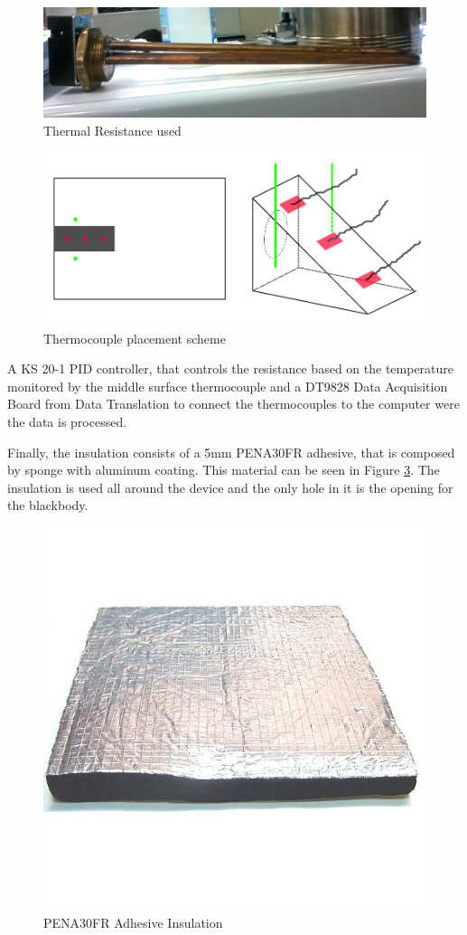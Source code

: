 \begin{figure}[h]
\centering
\includegraphics[width=0.9\linewidth]{Figures/4.Chapter/resistencia.png}
\caption{Thermal Resistance used}
\label{fig:res}
\end{figure}

\begin{figure}[h]
\centering
\includegraphics[width=0.9\linewidth]{Figures/4.Chapter/termopares.png}
\caption{Thermocouple placement scheme}
\label{fig:tpar}
\end{figure}

\par A KS 20-1 PID controller, that controls the resistance based on the temperature monitored by the middle surface thermocouple and a DT9828 Data Acquisition Board from Data Translation to connect the thermocouples to the computer were the data is processed.\\

\par Finally, the insulation consists of a 5mm PENA30FR adhesive, that is composed by sponge with aluminum coating. This material can be seen in Figure \ref{fig:isola}. The insulation is used all around the device and the only hole in it is the opening for the blackbody. \\

\begin{figure}[h]
\centering
\includegraphics[width=0.5\linewidth]{Figures/4.Chapter/insulation.jpg}
\caption{PENA30FR Adhesive Insulation}
\label{fig:isola}
\end{figure}

